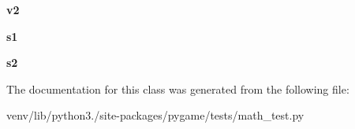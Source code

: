 \begin{DoxyCompactItemize}
{\bfseries v2}
\item 
\mbox{\label{classpygame_1_1tests_1_1math__test_1_1_vector3_type_test_aed7e2f48d2878bf3c6a16f2cd40261a5}} 
{\bfseries s1}
\item 
\mbox{\label{classpygame_1_1tests_1_1math__test_1_1_vector3_type_test_a60a87380e6c7af5ecd44dc3650635874}} 
{\bfseries s2}
\end{DoxyCompactItemize}


The documentation for this class was generated from the following file\+:\begin{DoxyCompactItemize}
\item 
venv/lib/python3./site-\/packages/pygame/tests/math\+\_\+test.\+py\end{DoxyCompactItemize}
